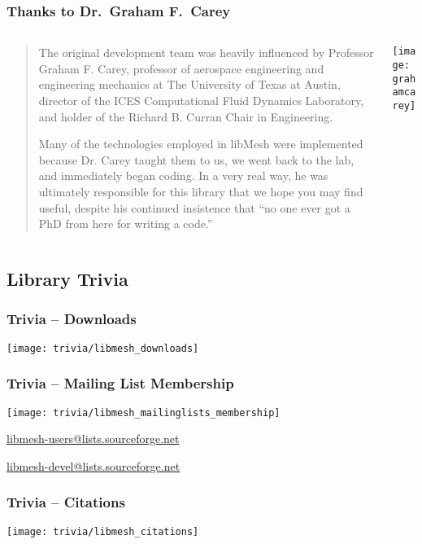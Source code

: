 \frame
{
  \frametitle{Thanks to Dr.\ Graham F.\ Carey}

  \begin{columns}
    \begin{column}{.55\textwidth}
      \scriptsize
      \begin{quote}
        The original development team was heavily influenced by Professor Graham F. Carey, professor of aerospace engineering and engineering mechanics at The University of Texas at Austin, director of the ICES Computational Fluid Dynamics Laboratory, and holder of the Richard B. Curran Chair in Engineering.

        Many of the technologies employed in libMesh were implemented because Dr. Carey taught them to us, we went back to the lab, and immediately began coding. In a very real way, he was ultimately responsible for this library that we hope you may find useful, despite his continued insistence that ``no one ever got a PhD from here for writing a code.''
      \end{quote}
\normalsize
    \end{column}
    \begin{column}{.45\textwidth}
      \texttt{[image: grahamcarey]}
    \end{column}
  \end{columns}
}

\subsection{Library Trivia}
\frame
{
  \frametitle{Trivia -- Downloads}
  \begin{center}
    \texttt{[image: trivia/libmesh\_downloads]}
  \end{center}
}

\frame
{
  \frametitle{Trivia -- Mailing List Membership}
  \begin{center}
    \texttt{[image: trivia/libmesh\_mailinglists\_membership]}

    \small

    \url{libmesh-users@lists.sourceforge.net}

    \url{libmesh-devel@lists.sourceforge.net}
  \end{center}
}

\frame
{
  \frametitle{Trivia -- Citations}
  \begin{center}
    \texttt{[image: trivia/libmesh\_citations]}
  \end{center}
}
